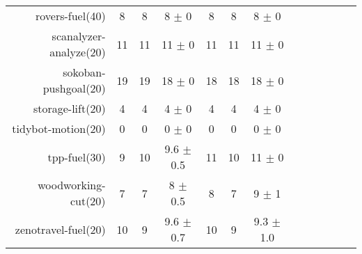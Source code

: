 \begin{center}
\begin{tabular}{|r|*{4}{ccc|}}
rovers-fuel(40) & 8 & 8 & 8 \(\pm\) 0 & 8 & 8 & 8 \(\pm\) 0\\
scanalyzer-analyze(20) & 11 & 11 & 11 \(\pm\) 0 & 11 & 11 & 11 \(\pm\) 0\\
sokoban-pushgoal(20) & 19 & 19 & 18 \(\pm\) 0 & 18 & 18 & 18 \(\pm\) 0\\
storage-lift(20) & 4 & 4 & 4 \(\pm\) 0 & 4 & 4 & 4 \(\pm\) 0\\
tidybot-motion(20) & 0 & 0 & 0 \(\pm\) 0 & 0 & 0 & 0 \(\pm\) 0\\
tpp-fuel(30) & 9 & 10 & 9.6 \(\pm\) 0.5 & 11 & 10 & 11 \(\pm\) 0\\
woodworking-cut(20) & 7 & 7 & 8 \(\pm\) 0.5 & 8 & 7 & 9 \(\pm\) 1\\
zenotravel-fuel(20) & 10 & 9 & 9.6 \(\pm\) 0.7 & 10 & 9 & 9.3 \(\pm\) 1.0\\
\end{tabular}
\end{center}
